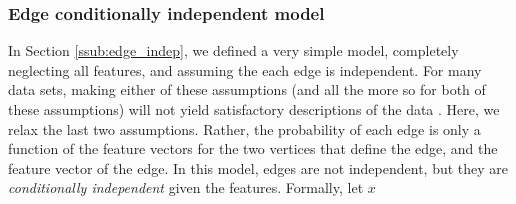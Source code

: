 \subsubsection{Edge conditionally independent model} %
\label{ssub:edge_cond}


In Section \ref{ssub:edge_indep}, we defined a very simple model, completely neglecting all features, and assuming the each edge is independent.  For many data sets, making either of these assumptions (and all the more so for both of these assumptions) will not yield satisfactory descriptions of the data \cite{?}.  Here, we relax the last two assumptions.  Rather, the probability of each edge is only a function of the feature vectors for the two vertices that define the edge, and the feature vector of the edge.  In this model, edges are not independent, but they are \emph{conditionally independent} given the features.   Formally, let $x$

